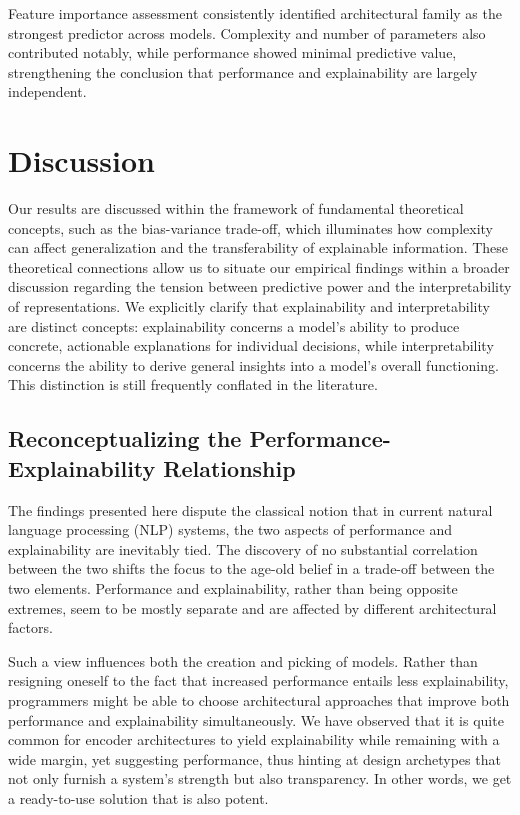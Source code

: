 \documentclass[preprint,12pt]{elsarticle}
\begin{document}
Feature importance assessment consistently identified architectural family as the strongest predictor across models. Complexity and number of parameters also contributed notably, while performance showed minimal predictive value, strengthening the conclusion that performance and explainability are largely independent.

\section{Discussion}
\label{sec:discussion}

Our results are discussed within the framework of fundamental theoretical concepts, such as the bias-variance trade-off, which illuminates how complexity can affect generalization and the transferability of explainable information. These theoretical connections allow us to situate our empirical findings within a broader discussion regarding the tension between predictive power and the interpretability of representations. We explicitly clarify that explainability and interpretability are distinct concepts: explainability concerns a model's ability to produce concrete, actionable explanations for individual decisions, while interpretability concerns the ability to derive general insights into a model's overall functioning. This distinction is still frequently conflated in the literature.

\subsection{Reconceptualizing the Performance-Explainability Relationship}

The findings presented here dispute the classical notion that in current natural language processing (NLP) systems, the two aspects of performance and explainability are inevitably tied. The discovery of no substantial correlation between the two shifts the focus to the age-old belief in a trade-off between the two elements. Performance and explainability, rather than being opposite extremes, seem to be mostly separate and are affected by different architectural factors.

Such a view influences both the creation and picking of models. Rather than resigning oneself to the fact that increased performance entails less explainability, programmers might be able to choose architectural approaches that improve both performance and explainability simultaneously. We have observed that it is quite common for encoder architectures to yield explainability while remaining with a wide margin, yet suggesting performance, thus hinting at design archetypes that not only furnish a system's strength but also transparency. In other words, we get a ready-to-use solution that is also potent.
\end{document}
